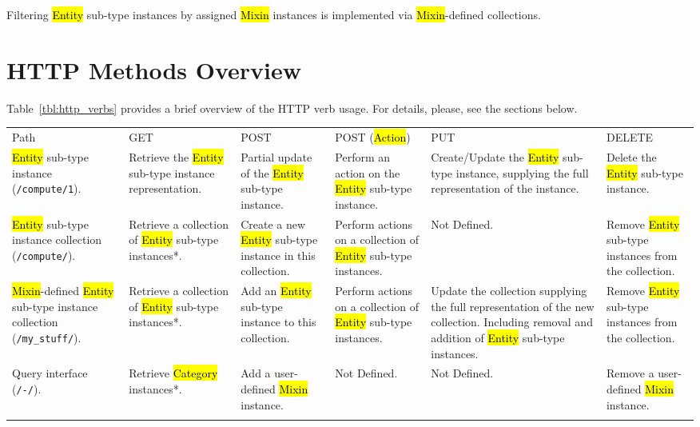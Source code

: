 \documentclass[10pt,a4paper]{article}
\begin{document}
Filtering \hl{Entity} sub-type instances by assigned \hl{Mixin} instances is implemented via \hl{Mixin}-defined collections.

\section{HTTP Methods Overview}
Table~\ref{tbl:http_verbs} provides a brief overview of the HTTP verb usage. For details, please, see the sections below.

 {
  \begin{tabularx}{\textwidth}{p{0.85in} p{0.85in} p{0.85in} p{0.85in} p{0.85in} p{0.85in}}
  \toprule
  Path
  & GET
  & POST
  & POST (\hl{Action})
  & PUT
  & DELETE \\

  \colrule
  \hl{Entity} sub-type instance ({\tt /compute/1}).
  & Retrieve the \hl{Entity} sub-type instance representation.
  & Partial update of the \hl{Entity} sub-type instance.
  & Perform an action on the \hl{Entity} sub-type instance.
  & Create/Update the \hl{Entity} sub-type instance, supplying the full
    representation of the instance.
  & Delete the \hl{Entity} sub-type instance. \\

  \colrule
  \hl{Entity} sub-type instance collection ({\tt /compute/}).
  & Retrieve a collection of \hl{Entity} sub-type instances*.
  & Create a new \hl{Entity} sub-type instance in this collection.
  & Perform actions on a collection of \hl{Entity} sub-type instances.
  & Not Defined.
  & Remove \hl{Entity} sub-type instances from the collection. \\

  \colrule
  \hl{Mixin}-defined \hl{Entity} sub-type instance
    collection ({\tt /my\_stuff/}).
  & Retrieve a collection of \hl{Entity} sub-type instances*.
  & Add an \hl{Entity} sub-type instance to this collection.
  & Perform actions on a collection of \hl{Entity} sub-type instances.
  & Update the collection supplying the full representation
    of the new collection. Including removal and addition of \hl{Entity}
    sub-type instances.
  & Remove \hl{Entity} sub-type instances from the collection. \\

  \colrule
  Query interface ({\tt /-/}).
  & Retrieve \hl{Category} instances*.
  & Add a user-defined \hl{Mixin} instance.
  & Not Defined.
  & Not Defined.
  & Remove a user-defined \hl{Mixin} instance. \\
  \botrule
  \end{tabularx}
}
\end{document}
